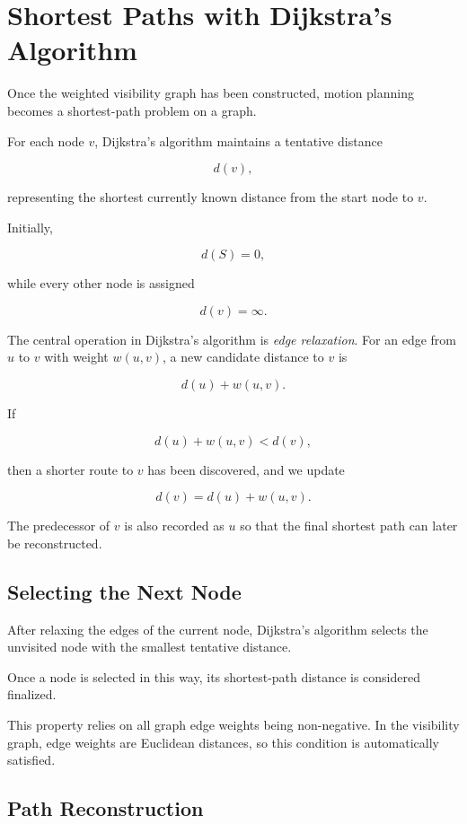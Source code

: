 \section{Shortest Paths with Dijkstra's Algorithm}

Once the weighted visibility graph has been constructed, motion planning
becomes a shortest-path problem on a graph.

For each node $v$, Dijkstra's algorithm maintains a tentative distance

\[
d(v),
\]

representing the shortest currently known distance from the start node to
$v$.

Initially,

\[
d(S)=0,
\]

while every other node is assigned

\[
d(v)=\infty.
\]

The central operation in Dijkstra's algorithm is \emph{edge relaxation}.
For an edge from $u$ to $v$ with weight $w(u,v)$, a new candidate distance
to $v$ is

\[
d(u)+w(u,v).
\]

If

\[
d(u)+w(u,v)<d(v),
\]

then a shorter route to $v$ has been discovered, and we update

\[
d(v)=d(u)+w(u,v).
\]

The predecessor of $v$ is also recorded as $u$ so that the final shortest
path can later be reconstructed.

\subsection{Selecting the Next Node}

After relaxing the edges of the current node, Dijkstra's algorithm selects
the unvisited node with the smallest tentative distance.

Once a node is selected in this way, its shortest-path distance is considered
finalized.

This property relies on all graph edge weights being non-negative. In the
visibility graph, edge weights are Euclidean distances, so this condition is
automatically satisfied.

\subsection{Path Reconstruction}

